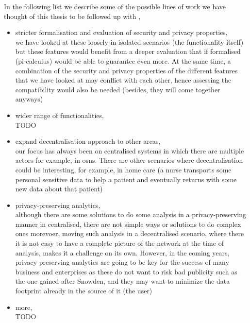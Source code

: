 In the following list we describe some of the possible lines of work we have thought 
of this thesis to be followed up with ,
\begin{itemize}
    
    \item stricter formalisation and evaluation of security and privacy properties,\\
    we have looked at these loosely in isolated scenarios (the functionality itself)
    but these features would benefit from a deeper evaluation that if formalised (pi-calculus) 
    would be able to guarantee even more.
    At the same time, a combination of the security and privacy properties of the 
    different features that we have looked at may conflict with each other, hence 
    assessing the compatibility would also be needed (besides, they will come together 
    anyways)
    
    \item wider range of functionalities,\\
    TODO
    
    \item expand decentralisation approach to other areas,\\
    our focus has always been on centralised systems in which there are multiple actors
    for example, in osns. There are other scenarios where decentralisation could 
    be interesting, for example, in home care (a nurse transports some personal sensitive data
    to help a patient and eventually returns with some new data about that patient)
    
    \item privacy-preserving analytics,\\
    although there are some solutions to do some analysis in a privacy-preserving 
    manner in centralised, there are not simple ways or solutions to do complex ones
    morevoer, moving such analysis in a decentralised scenario, where there it is 
    not easy to have a complete picture of the network at the time of analysis, makes
    it a challenge on its own.
    However, in the coming years, privacy-preserving analytics are going to be key 
    for the success of many business and enterprises as these do not want to risk 
    bad publicity such as the one gained after Snowden, and they may want to minimize 
    the data footprint already in the source of it (the user)
    
    \item more,\\
    TODO

\end{itemize}

